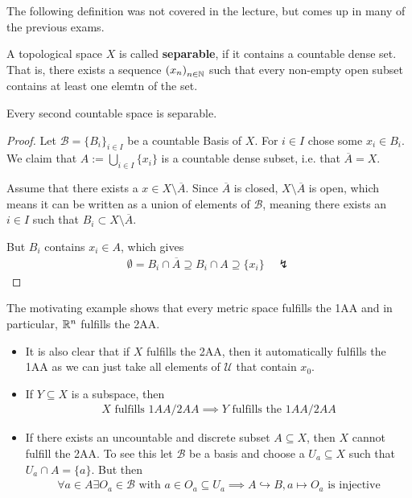 The following definition was not covered in the lecture, but comes up in many of the previous exams.
\begin{dfn}[]
  A topological space $X$ is called \textbf{separable}, if it contains a countable dense set.
  That is, there exists a sequence $\left(x_{n}\right)_{n \in \mathbb{N}}$ such that every non-empty open subset contains at least one elemtn of the set.
\end{dfn}
\begin{lem}[]
  Every second countable space is separable.
\end{lem}
\begin{proof}
  Let $\mathcal{B} = \{B_i\}_{i \in I}$ be a countable Basis of $X$.
  For $i \in I$ chose some $x_i \in B_i$. 
  We claim that $A := \bigcup_{i \in I} \{x_i\}$ is a countable dense subset, i.e. that $\overline{A} = X$.

  Assume that there exists a $x \in X \setminus \overline{A}$. 
  Since $\overline{A}$ is closed, $X \setminus \overline{A}$ is open, which means it can be written as a union of elements of $\mathcal{B}$, meaning there exists an $i \in I$ such that $B_i \subset X \setminus \overline{A}$.

  But $B_i$ contains $x_i \in A$, which gives
  \begin{align*}
    \emptyset = B_i \cap \overline{A} \supseteq B_i \cap A \supseteq \{x_i\} \quad \lightning
  \end{align*}
\end{proof}

  The motivating example shows that every metric space fulfills the 1AA and in particular, $\mathbb{R}^{n}$ fulfills the 2AA.
\begin{itemize}
  \item It is also clear that if $X$ fulfills the 2AA, then it automatically fulfills the 1AA as we can just take all elements of $\mathcal{U}$ that contain $x_0$.
  \item If $Y \subseteq X$ is a subspace, then 
    \begin{align*}
      X \text{ fulfills } 1AA/2AA \implies Y \text{ fulfills the } 1AA/2AA
    \end{align*}
  \item If there exists an uncountable and discrete subset $A \subseteq X$, then $X$ cannot fulfill the 2AA.
    To see this let $\mathcal{B}$ be a basis and choose a $U_a \subseteq X$ such that $U_a \cap A = \{a\}$. But then
    \begin{align*}
      \forall a \in A \exists O_a \in \mathcal{B} \text{ with } a \in O_a \subseteq U_a \implies A \hookrightarrow B, a \mapsto O_a \text{ is injective}
    \end{align*}
\end{itemize}


